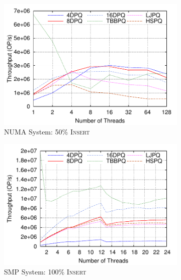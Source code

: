 \documentclass[10pt,journal,letter,compsoc]{IEEEtran}
\begin{document}
\begin{figure}[t]
\begin{subfigure}{0.33\textwidth}
        \includegraphics[width=1\columnwidth]{./data/amd50insertion.pdf}
        \caption{NUMA System: 50\% \textsc{Insert}}
        \label{fig:50ins}
    \end{subfigure}
    \begin{subfigure}{0.33\textwidth}
        \centering
        \includegraphics[width=1\columnwidth]{./data/intel100insertion.pdf}
        \caption{SMP System: 100\% \textsc{Insert}}
        \label{fig:100insintel}
    \end{subfigure}
    \hfill
    \begin{subfigure}{0.33\textwidth}
        \centering

\end{subfigure}
\end{figure}
\end{document}
